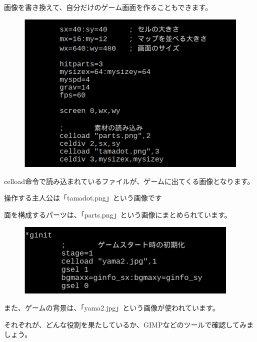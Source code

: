 画像を書き換えて、自分だけのゲーム画面を作ることもできます。

\begin{figure}[H]
    \begin{center}
      \includegraphics[keepaspectratio]{text04-img/s_jumpsrcpart.png}
    \end{center}
    \label{fig:prog_menu}
\end{figure}

celload命令で読み込まれているファイルが、ゲームに出てくる画像となります。

操作する主人公は「tamadot.png」という画像です

面を構成するパーツは、「parts.png」という画像にまとめられています。

\begin{figure}[H]
    \begin{center}
      \includegraphics[keepaspectratio,width=10.689cm,height=3.538cm]{text04-img/s_jumpbackgroundsrc.png}
    \end{center}
    \label{fig:prog_menu}
\end{figure}

また、ゲームの背景は、「yama2.jpg」という画像が使われています。

それぞれが、どんな役割を果たしているか、GIMPなどのツールで確認してみましょう。



